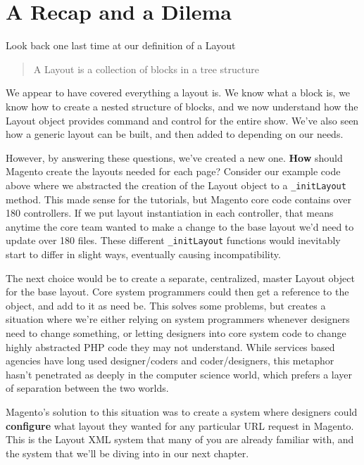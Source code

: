 \documentclass[oneside]{book}
\begin{document}
\section{A Recap and a Dilema}

Look back one last time at our definition of a Layout

\begin{quote}
A Layout is a collection of blocks in a tree structure
\end{quote}

We appear to have covered everything a layout is.  We know what a block is, we know how to create a nested structure of blocks, and we now understand how the Layout object provides command and control for the entire show.  We've also seen how a generic layout can be built, and then added to depending on our needs.

However, by answering these questions, we've created a new one.  \textbf{How} should Magento create the layouts needed for each page?  Consider our example code above where we abstracted the creation of the Layout object to a \footnotesize\texttt{\_initLayout} \normalsize  method. This made sense for the tutorials, but Magento core code contains over 180 controllers.  If we put layout instantiation in each controller, that means anytime the core team wanted to make a change to the base layout we'd need to update over 180 files.  These different \footnotesize\texttt{\_initLayout} \normalsize  functions would inevitably start to differ in slight ways, eventually causing incompatibility.

The next choice would be to create a separate, centralized, master Layout object for the base layout. Core system programmers could then get a reference to the object, and add to it as need be.  This solves some problems, but creates a situation where we're either relying on system programmers whenever designers need to change something, or letting designers into core system code to change highly abstracted PHP code they may not understand.  While services based agencies have long used designer/coders and coder/designers, this metaphor hasn't penetrated as deeply in the computer science world, which prefers a layer of separation between the two worlds.

Magento's solution to this situation was to create a system where designers could \textbf{configure} what layout they wanted for any particular URL request in Magento.  This is the Layout XML system that many of you are already familiar with, and the system that we'll be diving into in our next chapter.
\end{document}
